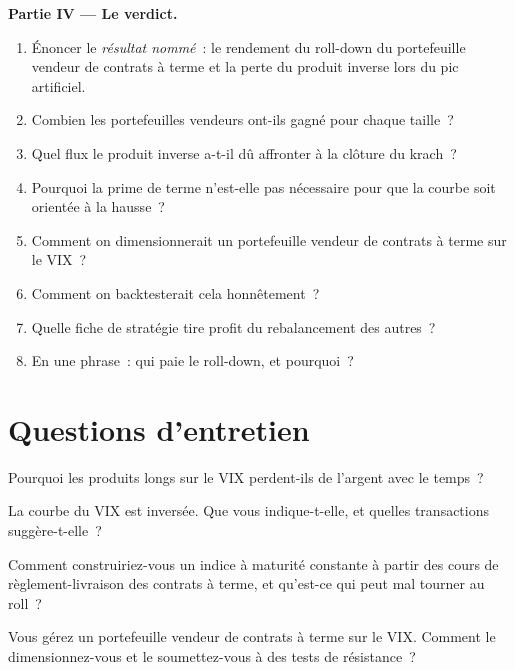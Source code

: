 \begin{problem}
\medskip\noindent\textbf{Partie IV --- Le verdict.}
\begin{enumerate}[resume]
\item Énoncer le \emph{résultat nommé}~: le rendement du roll-down du portefeuille vendeur de contrats à terme et la perte du produit inverse lors du pic artificiel.
\item Combien les portefeuilles vendeurs ont-ils gagné pour chaque taille~?
\item Quel flux le produit inverse a-t-il dû affronter à la clôture du krach~?
\item Pourquoi la prime de terme n'est-elle pas nécessaire pour que la courbe soit orientée à la hausse~?
\item Comment on dimensionnerait un portefeuille vendeur de contrats à terme sur le VIX~?
\item Comment on backtesterait cela honnêtement~?
\item Quelle fiche de stratégie tire profit du rebalancement des autres~?
\item En une phrase~: qui paie le roll-down, et pourquoi~?
\end{enumerate}
\end{problem}

\section{Questions d'entretien}

\begin{interviewq}\label{iq:s2:the-volatility-index-complex:1}
Pourquoi les produits longs sur le VIX perdent-ils de l'argent avec le temps~?
\end{interviewq}

\begin{interviewq}\label{iq:s2:the-volatility-index-complex:2}
La courbe du VIX est inversée. Que vous indique-t-elle, et quelles transactions suggère-t-elle~?
\end{interviewq}

\begin{interviewq}\label{iq:s2:the-volatility-index-complex:3}
Comment construiriez-vous un indice à maturité constante à partir des cours de règlement-livraison des contrats à terme, et qu'est-ce qui peut mal tourner au roll~?
\end{interviewq}

\begin{interviewq}\label{iq:s2:the-volatility-index-complex:4}
Vous gérez un portefeuille vendeur de contrats à terme sur le VIX. Comment le dimensionnez-vous et le soumettez-vous à des tests de résistance~?
\end{interviewq}

